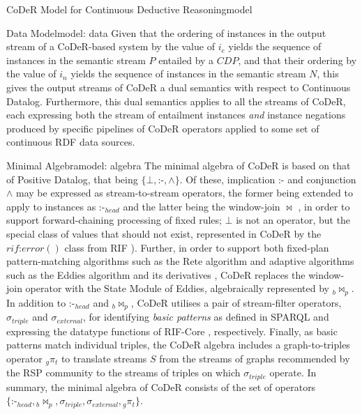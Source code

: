 \begin{nestedsection}{CoDeR Model for Continuous Deductive Reasoning}{model}
\begin{nestedsection}{Data Model}{model: data}
		Given that the ordering of instances in the output stream of a CoDeR-based system by the value of $i_{e}$ yields the sequence of instances in the semantic stream $P$ entailed by a ${CDP}$, and that their ordering by the value of $i_{n}$ yields the sequence of instances in the semantic stream $N$, this gives the output streams of CoDeR a dual semantics with respect to Continuous Datalog.
		Furthermore, this dual semantics applies to all the streams of CoDeR, each expressing both the stream of entailment instances \emph{and} instance negations produced by specific pipelines of CoDeR operators applied to some set of continuous RDF data sources.
	\end{nestedsection}

	\begin{nestedsection}{Minimal Algebra}{model: algebra}
		The minimal algebra of CoDeR is based on that of Positive Datalog, that being ${\{\bot, \text{:-}, \wedge\}}$.
		Of these, implication $\text{:-}$ and conjunction $\wedge$ may be expressed as stream-to-stream operators, the former being extended to apply to instances as $\text{:-}_{head}$ and the latter being the window-join $\Join$ \citep{niagaraCQ}, in order to support forward-chaining processing of fixed rules;
		$\bot$ is not an operator, but the special class of values that should not exist, represented in CoDeR by the ${rif\text{:}error()}$ class from RIF \citep{w3crif}).
		Further, in order to support both fixed-plan pattern-matching algorithms such as the Rete algorithm \citep{forgy79} and adaptive algorithms such as the Eddies algorithm \citep{eddies} and its derivatives \citep{CACQ,TCQ}, CoDeR replaces the window-join operator with the State Module of Eddies, algebraically represented by ${{}_b\Join_p}$.
		In addition to $\text{:-}_{head}$ and ${{}_b\Join_p}$, CoDeR utilises a pair of stream-filter operators, $\sigma_{triple}$ and $\sigma_{external}$, for identifying \emph{basic patterns} as defined in SPARQL \citep{w3csparql} and expressing the datatype functions of RIF-Core \citep{w3crifcore}, respectively.
		Finally, as basic patterns match individual triples, the CoDeR algebra includes a graph-to-triples operator ${{}_g\pi_t}$ to translate streams $S$ from the streams of graphs recommended by the RSP community to the streams of triples on which $\sigma_{triple}$ operate.
		In summary, the minimal algebra of CoDeR consists of the set of operators ${\{\text{:-}_{head}, {}_b{\Join_p}, \sigma_{triple}, \sigma_{external}, {}_g{\pi_t}\}}$.


\end{nestedsection}
\end{nestedsection}

